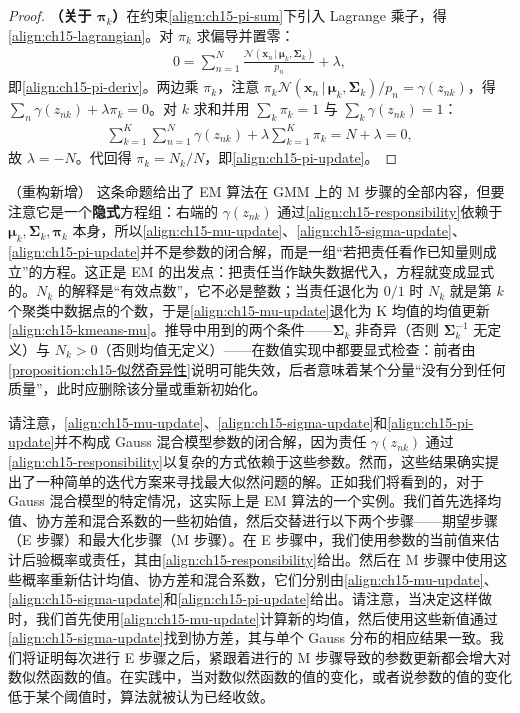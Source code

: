 \documentclass[../../main.tex]{subfiles}
\begin{document}
\begin{proof}
\textbf{（关于 $\bm{\pi}_k$）}在约束\eqref{align:ch15-pi-sum}下引入 Lagrange 乘子，得\eqref{align:ch15-lagrangian}。对 $\pi_k$ 求偏导并置零：
\begin{align*}
0=\sum_{n=1}^{N}\frac{\mathcal{N}(\bm{x}_n\,|\,\bm{\mu}_k,\bm{\Sigma}_k)}{p_n}+\lambda,
\end{align*}
即\eqref{align:ch15-pi-deriv}。两边乘 $\pi_k$，注意 $\pi_k\mathcal{N}(\bm{x}_n\,|\,\bm{\mu}_k,\bm{\Sigma}_k)/p_n=\gamma(z_{nk})$，得 $\sum_n\gamma(z_{nk})+\lambda\pi_k=0$。对 $k$ 求和并用 $\sum_k\pi_k=1$ 与 $\sum_k\gamma(z_{nk})=1$：
\begin{align*}
\sum_{k=1}^{K}\sum_{n=1}^{N}\gamma(z_{nk})+\lambda\sum_{k=1}^{K}\pi_k=N+\lambda=0,
\end{align*}
故 $\lambda=-N$。代回得 $\pi_k=N_k/N$，即\eqref{align:ch15-pi-update}。
\end{proof}

\begin{remark}（重构新增）
这条命题给出了 EM 算法在 GMM 上的 M 步骤的全部内容，但要注意它是一个\textbf{隐式}方程组：右端的 $\gamma(z_{nk})$ 通过\eqref{align:ch15-responsibility}依赖于 $\bm{\mu}_k,\bm{\Sigma}_k,\bm{\pi}_k$ 本身，所以\eqref{align:ch15-mu-update}、\eqref{align:ch15-sigma-update}、\eqref{align:ch15-pi-update}并不是参数的闭合解，而是一组“若把责任看作已知量则成立”的方程。这正是 EM 的出发点：把责任当作缺失数据代入，方程就变成显式的。$N_k$ 的解释是“有效点数”，它不必是整数；当责任退化为 $0/1$ 时 $N_k$ 就是第 $k$ 个聚类中数据点的个数，于是\eqref{align:ch15-mu-update}退化为 K 均值的均值更新\eqref{align:ch15-kmeans-mu}。推导中用到的两个条件——$\bm{\Sigma}_k$ 非奇异（否则 $\bm{\Sigma}_k^{-1}$ 无定义）与 $N_k>0$（否则均值无定义）——在数值实现中都要显式检查：前者由\cref{proposition:ch15-似然奇异性}说明可能失效，后者意味着某个分量“没有分到任何质量”，此时应删除该分量或重新初始化。
\end{remark}

请注意，\eqref{align:ch15-mu-update}、\eqref{align:ch15-sigma-update}和\eqref{align:ch15-pi-update}并不构成 Gauss 混合模型参数的闭合解，因为责任 $\gamma(z_{nk})$ 通过\eqref{align:ch15-responsibility}以复杂的方式依赖于这些参数。然而，这些结果确实提出了一种简单的迭代方案来寻找最大似然问题的解。正如我们将看到的，对于 Gauss 混合模型的特定情况，这实际上是 EM 算法的一个实例。我们首先选择均值、协方差和混合系数的一些初始值，然后交替进行以下两个步骤——期望步骤（E 步骤）和最大化步骤（M 步骤）。在 E 步骤中，我们使用参数的当前值来估计后验概率或责任，其由\eqref{align:ch15-responsibility}给出。然后在 M 步骤中使用这些概率重新估计均值、协方差和混合系数，它们分别由\eqref{align:ch15-mu-update}、\eqref{align:ch15-sigma-update}和\eqref{align:ch15-pi-update}给出。请注意，当决定这样做时，我们首先使用\eqref{align:ch15-mu-update}计算新的均值，然后使用这些新值通过\eqref{align:ch15-sigma-update}找到协方差，其与单个 Gauss 分布的相应结果一致。我们将证明每次进行 E 步骤之后，紧跟着进行的 M 步骤导致的参数更新都会增大对数似然函数的值。在实践中，当对数似然函数的值的变化，或者说参数的值的变化低于某个阈值时，算法就被认为已经收敛。
\end{document}
